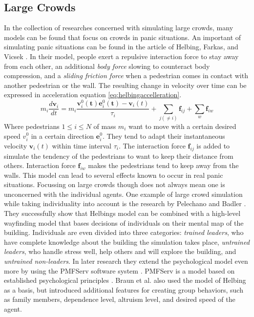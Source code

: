 \documentclass[11pt, a4paper]{book}
\begin{document}
\subsection{Large Crowds}
In the collection of researches concerned with simulating large crowds, many models can be found that focus on crowds in panic situations. An important of simulating panic situations can be found in the article of Helbing, Farkas, and Vicsek \cite{citeulike1656038}. In their model, people exert a repulsive interaction force to stay away from each other, an additional \emph{body force} slowing to counteract body compression, and a \emph{sliding friction force} when a pedestrian comes in contact with another pedestrian or the wall. The resulting change in velocity over time can be expressed in acceleration equation \ref{eq:helbingaccelleration}.
\begin{equation}
m_i \frac{d \boldsymbol{v}_i}{dt} = m_i \frac{\boldsymbol{v}_i^0 (\boldsymbol{t}) \boldsymbol{e}_i^0(\boldsymbol{t}) - \boldsymbol{v}_i(t)}{\tau_i}
+\sum_{j (\neq i)} \boldsymbol{f}_{ij} + \sum_w \boldsymbol{f}_{iw}
\label{eq:helbingaccelleration}
\end{equation}
Where pedestrians $1 \leq i \leq N$ of mass $m_i$ want to move with a certain desired speed $v_i^0$ in a certain direction $\boldsymbol{e}_i^0$. They tend to adapt their instantaneous velocity $\boldsymbol{v}_i(t)$ within time interval $\tau_i$. The interaction force $\boldsymbol{f}_{ij}$ is added to simulate the tendency of the pedestrians to want to keep their distance from others. Interaction force $\boldsymbol{f}_{iw}$ makes the pedestrians tend to keep away from the walls. This model can lead to several effects known to occur in real panic situations. Focussing on large crowds though does not always mean one is unconcerned with the individual agents. One example of large crowd simulation while taking individuality into account is the research by Pelechano and Badler \cite{pelechano2006modeling}. They successfully show that Helbings model can be combined with a high-level wayfinding model that bases decisions of individuals on their mental map of the building. Individuals are even divided into three categories: \emph{trained leaders}, who have complete knowledge about the building the simulation takes place, \emph{untrained leaders}, who handle stress well, help others and will explore the building, and \emph{untrained non-leaders}. In later research they extend the psychological model even more by using the PMFServ software system \cite{citeulike1080090}. PMFServ is a model based on established psychological principles \cite{silverman2006human}. Braun et al. \cite{10.1109CASA.2003.1199317} also used the model of Helbing as a basis, but introduced additional features for creating group behaviors, such as family members, dependence level, altruism level, and desired speed of the agent.\\
\end{document}
